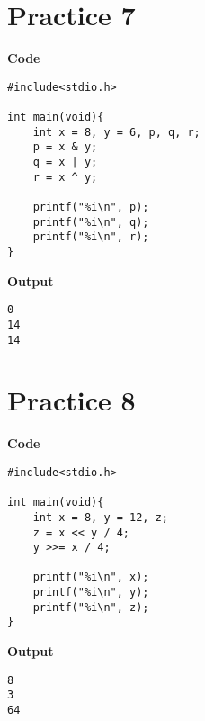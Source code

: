 \documentclass[a4paper, 11pt]{article}
\begin{document}
    \section*{Practice 7}
    \begin{minipage}[t]{0.5\textwidth}
        \large \textbf{Code}
        \begin{lstlisting}[style=code]
#include<stdio.h>

int main(void){
    int x = 8, y = 6, p, q, r;
    p = x & y;
    q = x | y;
    r = x ^ y;

    printf("%i\n", p);
    printf("%i\n", q);
    printf("%i\n", r); 
}
        \end{lstlisting}
    \end{minipage}
    \hspace{0.5cm}
    \begin{minipage}[t]{0.5\textwidth}
        \large \textbf{Output}
        \begin{lstlisting}[style=output]
0
14
14
        \end{lstlisting}
    \end{minipage}

    \section*{Practice 8}
    \begin{minipage}[t]{0.5\textwidth}
        \large \textbf{Code}
        \begin{lstlisting}[style=code]
#include<stdio.h>

int main(void){
    int x = 8, y = 12, z;
    z = x << y / 4;
    y >>= x / 4;

    printf("%i\n", x);
    printf("%i\n", y);
    printf("%i\n", z);
}
        \end{lstlisting}
    \end{minipage}
    \hspace{0.5cm}
    \begin{minipage}[t]{0.5\textwidth}
        \large \textbf{Output}
        \begin{lstlisting}[style=output]
8
3
64
        \end{lstlisting}
    \end{minipage}
\end{document}
